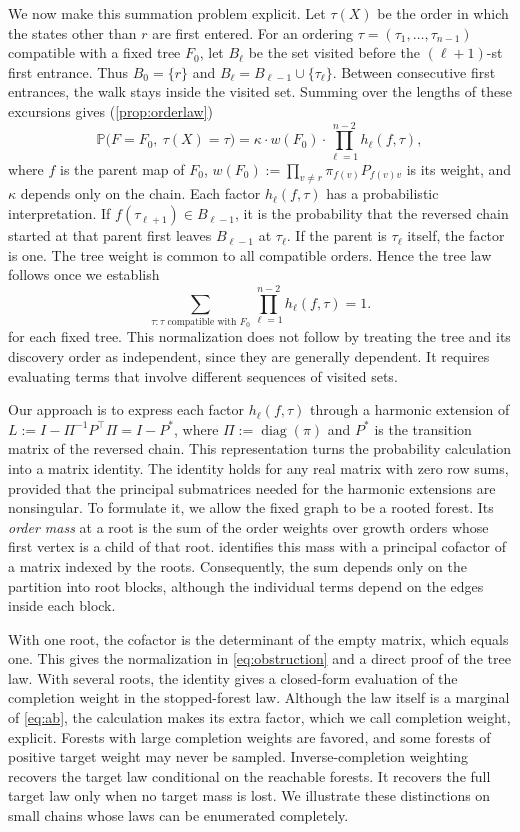 \documentclass[onefignum,onetabnum,nohypdvips]{siamart250211}
\numberwithin{theorem}{section}
\numberwithin{equation}{section}
\newcommand{\pr}{\mathbb{P}}
\DeclareMathOperator{\diag}{diag}
\begin{document}
We now make this summation problem explicit. Let $\tau(X)$ be the
order in which the states other than $r$ are first entered. For an
ordering $\tau=(\tau_1,\dots,\tau_{n-1})$ compatible with a fixed tree
$F_0$, let $B_\ell$ be the set visited before the $(\ell+1)$-st first
entrance. Thus $B_0=\{r\}$ and
$B_\ell=B_{\ell-1}\cup\{\tau_\ell\}$. Between consecutive first
entrances, the walk stays inside the visited set. Summing over the
lengths of these excursions gives (\cref{prop:orderlaw})
\begin{equation}\label{eq:obstruction}
\pr\big(F=F_0,\ \tau(X)=\tau\big)
=\kappa\cdot w(F_0)\cdot\prod_{\ell=1}^{n-2}h_{\ell}(f,\tau),
\end{equation}
where $f$ is the parent map of $F_0$,
$w(F_0):=\prod_{v\ne r}\pi_{f(v)}P_{f(v)v}$ is its weight, and
$\kappa$ depends only on the chain. Each factor $h_\ell(f,\tau)$ has a
probabilistic interpretation. If $f(\tau_{\ell+1})\in B_{\ell-1}$, it
is the probability that the reversed chain started at that parent
first leaves $B_{\ell-1}$ at $\tau_\ell$. If the parent is
$\tau_\ell$ itself, the factor is one. The tree weight is common to
all compatible orders. Hence the tree law follows once we establish
\[
\sum_{\tau:\tau\text{ compatible with }F_0}\prod_{\ell=1}^{n-2}h_{\ell}(f,\tau)=1.
\]
for each fixed tree. This normalization does not follow by treating
the tree and its discovery order as independent, since they are
generally dependent. It requires evaluating terms that involve
different sequences of visited sets.

Our approach is to express each factor $h_\ell(f,\tau)$ through a
harmonic extension of
$L:=I-\Pi^{-1}P^{\top}\Pi=I-P^{*}$, where $\Pi:=\diag(\pi)$ and $P^{*}$
is the transition matrix of the reversed chain. This representation
turns the probability calculation into a matrix identity. The
identity holds for any real matrix with zero row sums, provided that
the principal submatrices needed for the harmonic extensions are
nonsingular. To formulate it, we allow the fixed graph to be a rooted
forest. Its \emph{order mass} at a root is the sum of the order weights
over growth orders whose first vertex is a child of that root.
 identifies this mass with a principal cofactor of a
matrix indexed by the roots. Consequently, the sum depends only on the
partition into root blocks, although the individual terms depend on
the edges inside each block.

With one root, the cofactor is the determinant of the empty matrix,
which equals one. This gives the normalization in
\eqref{eq:obstruction} and a direct proof of the tree law. With several
roots, the identity gives a closed-form evaluation of the completion
weight in the stopped-forest law. Although the law itself is a marginal of
\eqref{eq:ab}, the calculation makes its extra factor, which we call completion weight, explicit.
Forests with large completion weights are favored, and some forests
of positive target weight may never be sampled. Inverse-completion
weighting recovers the target law conditional on the reachable
forests. It recovers the full target law only when no target mass is
lost. We illustrate these distinctions on small chains whose laws can
be enumerated completely.
\end{document}
